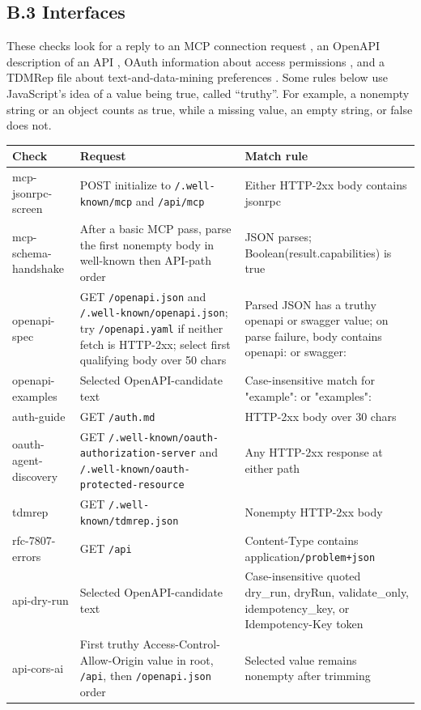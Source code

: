 \documentclass{article}
\begin{document}
\subsection*{B.3 Interfaces}

These checks look for a reply to an MCP connection request \cite{ref8}, an OpenAPI description of an API \cite{ref10}, OAuth information about access permissions \cite{ref11,ref12}, and a TDMRep file about text-and-data-mining preferences \cite{ref20}. Some rules below use JavaScript's idea of a value being true, called ``truthy''. For example, a nonempty string or an object counts as true, while a missing value, an empty string, or false does not.

\begingroup
\footnotesize
\setlength{\tabcolsep}{3pt}
\setlength{\LTleft}{0pt}
\setlength{\LTright}{0pt plus 1fill}
\begin{longtable}{>{\raggedright\arraybackslash}p{}>{\raggedright\arraybackslash}p{}>{\raggedright\arraybackslash}p{}}
\toprule
\textbf{Check} & \textbf{Request} & \textbf{Match rule} \\
\midrule
\endhead
mcp-jsonrpc-screen & POST initialize to \nolinkurl{/.well-known/mcp} and \nolinkurl{/api/mcp} & Either HTTP-2xx body contains jsonrpc \\
mcp-schema-handshake & After a basic MCP pass, parse the first nonempty body in well-known then API-path order & JSON parses; Boolean(result.capabilities) is true \\
openapi-spec & GET \nolinkurl{/openapi.json} and \nolinkurl{/.well-known/openapi.json}; try \nolinkurl{/openapi.yaml} if neither fetch is HTTP-2xx; select first qualifying body over 50 chars & Parsed JSON has a truthy openapi or swagger value; on parse failure, body contains openapi: or swagger: \\
openapi-examples & Selected OpenAPI-candidate text & Case-insensitive match for "example": or "examples": \\
auth-guide & GET \nolinkurl{/auth.md} & HTTP-2xx body over 30 chars \\
oauth-agent-discovery & GET \nolinkurl{/.well-known/oauth-authorization-server} and \nolinkurl{/.well-known/oauth-protected-resource} & Any HTTP-2xx response at either path \\
tdmrep & GET \nolinkurl{/.well-known/tdmrep.json} & Nonempty HTTP-2xx body \\
rfc-7807-errors & GET \nolinkurl{/api} & Content-Type contains application\nolinkurl{/problem+json} \\
api-dry-run & Selected OpenAPI-candidate text & Case-insensitive quoted dry\_run, dryRun, validate\_only, idempotency\_key, or Idempotency-Key token \\
api-cors-ai & First truthy Access-Control-Allow-Origin value in root, \nolinkurl{/api}, then \nolinkurl{/openapi.json} order & Selected value remains nonempty after trimming \\
\bottomrule
\end{longtable}
\endgroup
\end{document}
